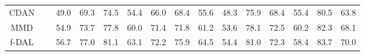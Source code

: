 \documentclass{article} \usepackage{iclr2023_conference,times}
\begin{document}
\begin{table}[t]
{\begin{tabular}{c|c|cccccccccccc|c}
CDAN~\citep{long2018conditional}           &                             & 49.0                                                         & 69.3                                                         & 74.5                                                         & 54.4                                                & 66.0                                                         & 68.4                                                & 55.6                                                & 48.3                                                         & 75.9                                                         & 68.4                                                & 55.4                                                         & 80.5                                                         & 63.8                                                         \\
MMD~\citep{zhang2019bridging}             &                             & 54.9                                                         & 73.7                                                         & 77.8                                                         & 60.0                                                & 71.4                                                         & 71.8                                                & 61.2                                                & 53.6                                                         & 78.1                                                         & 72.5                                                & 60.2                                                         & 82.3                                                         & 68.1                                                         \\
f-DAL~\citep{acuna2021f}           &                             & 56.7                                                         & 77.0                                                         & 81.1                                                         & 63.1                                                & 72.2                                                         & 75.9                                                & 64.5                                                & 54.4                                                         & 81.0                                                         & 72.3                                                & 58.4                                                         & 83.7                                                         & 70.0                                                         \\

\end{tabular}}
\end{table}
\end{document}
